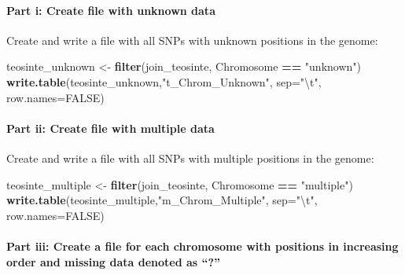 \documentclass[]{article}
\newenvironment{Shaded}{\begin{snugshade}}{\end{snugshade}}
\newcommand{\CharTok}[1]{\textcolor[rgb]{0.31,0.60,0.02}{#1}}
\newcommand{\DataTypeTok}[1]{\textcolor[rgb]{0.13,0.29,0.53}{#1}}
\newcommand{\KeywordTok}[1]{\textcolor[rgb]{0.13,0.29,0.53}{\textbf{#1}}}
\newcommand{\NormalTok}[1]{#1}
\newcommand{\OperatorTok}[1]{\textcolor[rgb]{0.81,0.36,0.00}{\textbf{#1}}}
\newcommand{\OtherTok}[1]{\textcolor[rgb]{0.56,0.35,0.01}{#1}}
\newcommand{\StringTok}[1]{\textcolor[rgb]{0.31,0.60,0.02}{#1}}
\let\oldparagraph\paragraph
\renewcommand{\paragraph}[1]{\oldparagraph{#1}\mbox{}}
\begin{document}
\hypertarget{part-i-create-file-with-unknown-data-1}{%
\paragraph{Part i: Create file with unknown
data}\label{part-i-create-file-with-unknown-data-1}}

Create and write a file with all SNPs with unknown positions in the
genome:

\begin{Shaded}
\begin{Highlighting}[]
\NormalTok{teosinte_unknown <-}\StringTok{ }\KeywordTok{filter}\NormalTok{(join_teosinte, Chromosome }\OperatorTok{==}\StringTok{ "unknown"}\NormalTok{)}
\KeywordTok{write.table}\NormalTok{(teosinte_unknown,}\StringTok{"t_Chrom_Unknown"}\NormalTok{, }\DataTypeTok{sep=}\StringTok{"}\CharTok{\textbackslash{}t}\StringTok{"}\NormalTok{, }\DataTypeTok{row.names=}\OtherTok{FALSE}\NormalTok{)}
\end{Highlighting}
\end{Shaded}

\hypertarget{part-ii-create-file-with-multiple-data-1}{%
\paragraph{Part ii: Create file with multiple
data}\label{part-ii-create-file-with-multiple-data-1}}

Create and write a file with all SNPs with multiple positions in the
genome:

\begin{Shaded}
\begin{Highlighting}[]
\NormalTok{teosinte_multiple <-}\StringTok{ }\KeywordTok{filter}\NormalTok{(join_teosinte, Chromosome }\OperatorTok{==}\StringTok{ "multiple"}\NormalTok{)}
\KeywordTok{write.table}\NormalTok{(teosinte_multiple,}\StringTok{"m_Chrom_Multiple"}\NormalTok{, }\DataTypeTok{sep=}\StringTok{"}\CharTok{\textbackslash{}t}\StringTok{"}\NormalTok{, }\DataTypeTok{row.names=}\OtherTok{FALSE}\NormalTok{)}
\end{Highlighting}
\end{Shaded}

\hypertarget{part-iii-create-a-file-for-each-chromosome-with-positions-in-increasing-order-and-missing-data-denoted-as-1}{%
\paragraph{Part iii: Create a file for each chromosome with positions in
increasing order and missing data denoted as
``?''}\label{part-iii-create-a-file-for-each-chromosome-with-positions-in-increasing-order-and-missing-data-denoted-as-1}}
\end{document}
